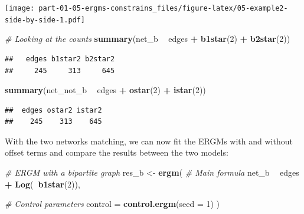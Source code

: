\documentclass[]{book}
\newenvironment{Shaded}{\begin{snugshade}}{\end{snugshade}}
\newcommand{\CommentTok}[1]{\textcolor[rgb]{0.56,0.35,0.01}{\textit{#1}}}
\newcommand{\DataTypeTok}[1]{\textcolor[rgb]{0.13,0.29,0.53}{#1}}
\newcommand{\DecValTok}[1]{\textcolor[rgb]{0.00,0.00,0.81}{#1}}
\newcommand{\KeywordTok}[1]{\textcolor[rgb]{0.13,0.29,0.53}{\textbf{#1}}}
\newcommand{\NormalTok}[1]{#1}
\newcommand{\OperatorTok}[1]{\textcolor[rgb]{0.81,0.36,0.00}{\textbf{#1}}}
\newcommand{\StringTok}[1]{\textcolor[rgb]{0.31,0.60,0.02}{#1}}
\begin{document}
\texttt{[image: part-01-05-ergms-constrains\_files/figure-latex/05-example2-side-by-side-1.pdf]}

\begin{Shaded}
\begin{Highlighting}[]
\CommentTok{# Looking at the counts}
\KeywordTok{summary}\NormalTok{(net_b }\OperatorTok{~}\StringTok{ }\NormalTok{edges }\OperatorTok{+}\StringTok{ }\KeywordTok{b1star}\NormalTok{(}\DecValTok{2}\NormalTok{) }\OperatorTok{+}\StringTok{ }\KeywordTok{b2star}\NormalTok{(}\DecValTok{2}\NormalTok{))}
\end{Highlighting}
\end{Shaded}

\begin{verbatim}
##   edges b1star2 b2star2 
##     245     313     645
\end{verbatim}

\begin{Shaded}
\begin{Highlighting}[]
\KeywordTok{summary}\NormalTok{(net_not_b }\OperatorTok{~}\StringTok{ }\NormalTok{edges }\OperatorTok{+}\StringTok{ }\KeywordTok{ostar}\NormalTok{(}\DecValTok{2}\NormalTok{) }\OperatorTok{+}\StringTok{ }\KeywordTok{istar}\NormalTok{(}\DecValTok{2}\NormalTok{))}
\end{Highlighting}
\end{Shaded}

\begin{verbatim}
##  edges ostar2 istar2 
##    245    313    645
\end{verbatim}

With the two networks matching, we can now fit the ERGMs with and without
offset terms and compare the results between the two models:

\begin{Shaded}
\begin{Highlighting}[]
\CommentTok{# ERGM with a bipartite graph}
\NormalTok{res_b     <-}\StringTok{ }\KeywordTok{ergm}\NormalTok{(}
  \CommentTok{# Main formula}
\NormalTok{  net_b }\OperatorTok{~}\StringTok{ }\NormalTok{edges }\OperatorTok{+}\StringTok{ }\KeywordTok{Log}\NormalTok{(}\OperatorTok{~}\KeywordTok{b1star}\NormalTok{(}\DecValTok{2}\NormalTok{)),}

  \CommentTok{# Control parameters}
  \DataTypeTok{control =} \KeywordTok{control.ergm}\NormalTok{(}\DataTypeTok{seed =} \DecValTok{1}\NormalTok{)}
\NormalTok{  )}
\end{Highlighting}
\end{Shaded}
\end{document}
